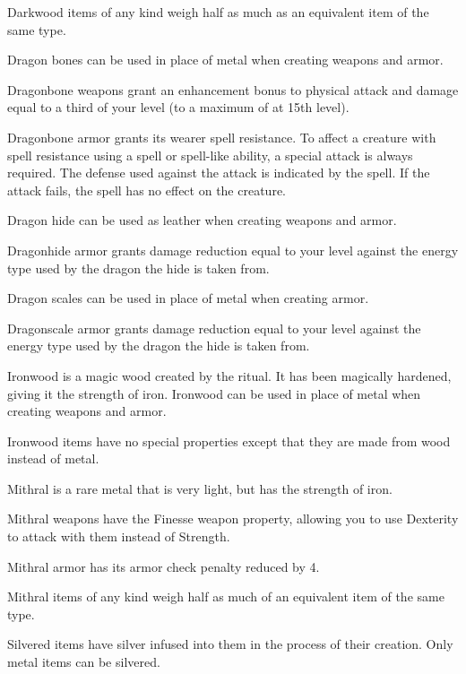 Darkwood items of any kind weigh half as much as an equivalent item of the same type.


Dragon bones can be used in place of metal when creating weapons and armor.

Dragonbone weapons grant an enhancement bonus to physical attack and damage equal to a third of your level (to a maximum of  at 15th level).

Dragonbone armor grants its wearer spell resistance.
To affect a creature with spell resistance using a spell or spell-like ability, a special attack is always required.
The defense used against the attack is indicated by the spell.
If the attack fails, the spell has no effect on the creature.


Dragon hide can be used as leather when creating weapons and armor.

Dragonhide armor grants damage reduction equal to your level against the energy type used by the dragon the hide is taken from.


Dragon scales can be used in place of metal when creating armor.

Dragonscale armor grants damage reduction equal to your level against the energy type used by the dragon the hide is taken from.

Ironwood is a magic wood created by the  ritual.
It has been magically hardened, giving it the strength of iron.
Ironwood can be used in place of metal when creating weapons and armor.

Ironwood items have no special properties except that they are made from wood instead of metal.

Mithral is a rare metal that is very light, but has the strength of iron.

Mithral weapons have the Finesse weapon property, allowing you to use Dexterity to attack with them instead of Strength.

Mithral armor has its armor check penalty reduced by 4.

Mithral items of any kind weigh half as much of an equivalent item of the same type.


Silvered items have silver infused into them in the process of their creation.
Only metal items can be silvered.

